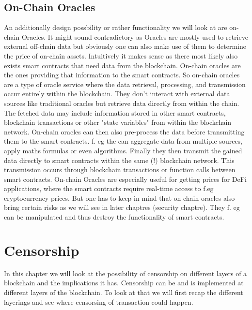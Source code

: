 \documentclass{article}
\begin{document}
\subsection{On-Chain Oracles}
An additionally design possbility or rather functionality we will look at are on-chain Oracles. It might sound contradictory as Oracles are mostly used to retrieve external off-chain data but obviously one can also make use of them to determine the price of on-chain assets. Intuitively it makes sense as there most likely also exists smart contracts that need data from the blockchain. On-chain oracles are the ones providing that information to the smart contracts. So on-chain oracles are a type of oracle service where the data retrieval, processing, and transmission occur entirely within the blockchain. They don't interact with external data sources like traditional oracles but retrieve data directly from within the chain. The fetched data may include information stored in other smart contracts, blockchain transactions or other "state variables" from within the blockchain network. On-chain oracles can then also pre-process the data before transmitting them to the smart contracts. f. eg the can aggregate data from multiple sources, apply maths formulas or even algorithms. Finally they then transmit the gained data directly to smart contracts within the same (!) blockchain network. This transmission occurs through blockchain transactions or function calls between smart contracts. On-chain Oracles are especially useful for getting prices for DeFi applications, where the smart contracts require real-time access to f.eg cryptocurrency prices. But one has to keep in mind that on-chain oracles also bring certain risks as we will see in later chaptres (security chaptre). They f. eg can be manipulated and thus destroy the functionality of smart contracts.

\section{Censorship}

In this chapter we will look at the possibility of censorship on different layers of a blockchain and the implications it has. Censorship can be and is implemented at different layers of the blockchain. To look at that we will first recap the different layerings and see where censorsing of transaction could happen.
\end{document}
